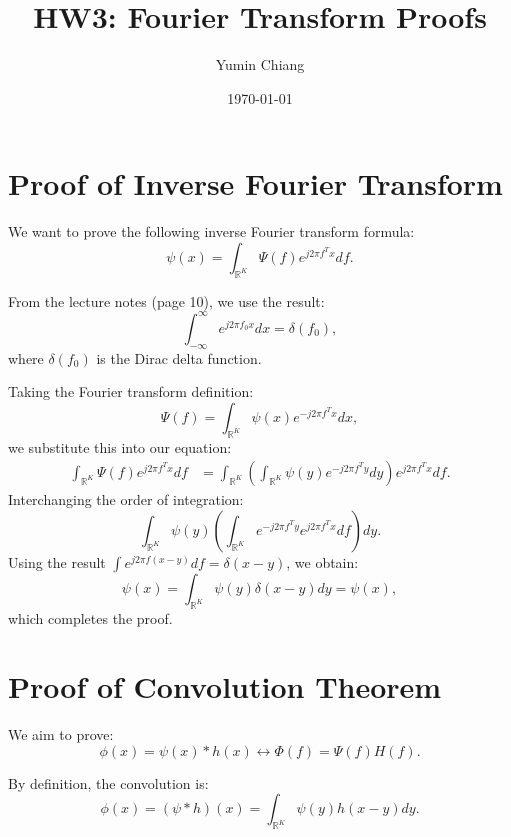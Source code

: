 \documentclass{article}
\title{HW3: Fourier Transform Proofs}
\author{Yumin Chiang}
\date{\today}
\begin{document}
\maketitle

\section{Proof of Inverse Fourier Transform}
We want to prove the following inverse Fourier transform formula:
\begin{equation}
    \psi(x) = \int_{\mathbb{R}^K} \Psi(f) e^{j 2\pi f^T x} df.
\end{equation}

From the lecture notes (page 10), we use the result:
\begin{equation}
    \int_{-\infty}^{\infty} e^{j 2\pi f_0 x} dx = \delta(f_0),
\end{equation}
where $\delta(f_0)$ is the Dirac delta function.

Taking the Fourier transform definition:
\begin{equation}
    \Psi(f) = \int_{\mathbb{R}^K} \psi(x) e^{-j 2\pi f^T x} dx,
\end{equation}
we substitute this into our equation:
\begin{align*}
    \int_{\mathbb{R}^K} \Psi(f) e^{j 2\pi f^T x} df &= \int_{\mathbb{R}^K} \left( \int_{\mathbb{R}^K} \psi(y) e^{-j 2\pi f^T y} dy \right) e^{j 2\pi f^T x} df.
\end{align*}
Interchanging the order of integration:
\begin{equation}
    \int_{\mathbb{R}^K} \psi(y) \left( \int_{\mathbb{R}^K} e^{-j 2\pi f^T y} e^{j 2\pi f^T x} df \right) dy.
\end{equation}
Using the result $\int e^{j 2\pi f (x-y)} df = \delta(x-y)$, we obtain:
\begin{equation}
    \psi(x) = \int_{\mathbb{R}^K} \psi(y) \delta(x-y) dy = \psi(x),
\end{equation}
which completes the proof.

\section{Proof of Convolution Theorem}
We aim to prove:
\begin{equation}
    \phi(x) = \psi(x) \ast h(x) \leftrightarrow \Phi(f) = \Psi(f) H(f).
\end{equation}

By definition, the convolution is:
\begin{equation}
    \phi(x) = (\psi \ast h)(x) = \int_{\mathbb{R}^K} \psi(y) h(x-y) dy.
\end{equation}
\end{document}
